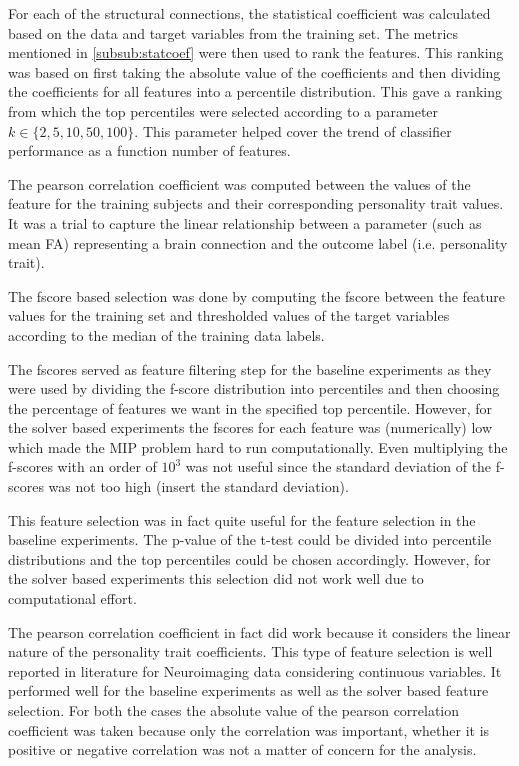 \documentclass[msthesis.tex]{subfiles}
\begin{document}
For each of the structural connections, the statistical coefficient was calculated based on the data and target variables from the training set. The metrics mentioned in \autoref{subsub:statcoef} were then used to rank the features. This ranking was based on first taking the absolute value of the coefficients and then dividing the coefficients for all features into a percentile distribution. This gave a ranking from which the top percentiles were selected according to a parameter $k \in \{2,5,10,50,100\}$. This parameter helped cover the trend of classifier performance as a function number of features.

\iffalse
The pearson correlation coefficient was computed between the values of the feature for the training subjects and their corresponding personality trait values. It was a trial to capture the linear relationship between a parameter (such as mean FA) representing a brain connection and the outcome label (i.e. personality trait).

The fscore based selection was done by computing the fscore between the feature values for the training set and thresholded values of the target variables according to the median of the training data labels. 

The fscores served as feature filtering step for the baseline experiments as they were used by dividing the f-score distribution into percentiles and then choosing the percentage of features we want in the specified top percentile. However, for the solver based experiments the fscores for each feature was (numerically) low which made the MIP problem hard to run computationally. Even multiplying the f-scores with an order of $10^3$ was not useful since the standard deviation of the f-scores was not too high (insert the standard deviation). 

This feature selection was in fact quite useful for the feature selection in the baseline experiments. The p-value of the t-test could be divided into percentile distributions and the top percentiles could be chosen accordingly. However, for the solver based experiments this selection did not work well due to computational effort. 

The pearson correlation coefficient in fact did work because it considers the linear nature of the personality trait coefficients. This type of feature selection is well reported in literature for Neuroimaging data considering continuous variables. It performed well for the baseline experiments as well as the solver based feature selection. For both the cases the absolute value of the pearson correlation coefficient was taken because only the correlation was important, whether it is positive or negative correlation was not a matter of concern for the analysis.
\end{document}
